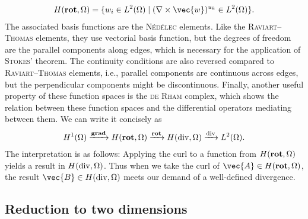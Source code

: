 \begin{gather}
  H (\Curl, \Omega) = \{ w_{i} \in L^{2} (\Omega) \; \vert \; (\curl \vec{w})^{u_{k}} \in L^2 (\Omega) \}.
\end{gather}
The associated basis functions are the \textsc{Nédélec} elements. Like the \textsc{Raviart}--\textsc{Thomas} elements, they use vectorial basis function, but the degrees of freedom are the parallel components along edges, which is necessary for the application of \textsc{Stokes}' theorem. The continuity conditions are also reversed compared to \textsc{Raviart}--\textsc{Thomas} elements, i.e., parallel components are continuous across edges, but the perpendicular components might be discontinuous. Finally, another useful property of these function spaces is the \textsc{de Rham} complex, which shows the relation between these function spaces and the differential operators mediating between them. We can write it concisely as
\begin{gather}
  H^{1} (\Omega) \xrightarrow{\operatorname{\mathbf{grad}}} H (\operatorname{\mathbf{rot}}, \Omega) \xrightarrow{\operatorname{\mathbf{rot}}} H (\operatorname{div}, \Omega) \xrightarrow{\operatorname{div}} L^{2} (\Omega).
\end{gather}
The interpretation is as follows: Applying the curl to a function from $H (\operatorname{\mathbf{rot}}, \Omega)$ yields a result in $H (\operatorname{div}, \Omega)$. Thus when we take the curl of $\vec{A} \in H (\Curl, \Omega)$, the result $\vec{B} \in H (\Divg, \Omega)$ meets our demand of a well-defined divergence.

\subsection{Reduction to two dimensions}
\label{sec:fourier-fem}

